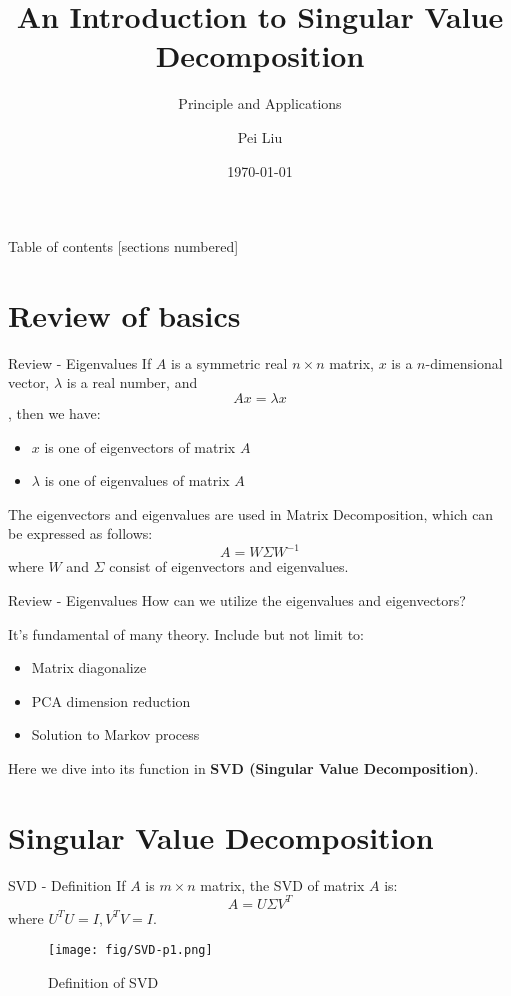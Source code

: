 \documentclass[10pt]{beamer}
\title{An Introduction to Singular Value Decomposition}
\subtitle{Principle and Applications}
\date{\today}
\author{Pei Liu}
\institute{Department of Computer Science @UESTC}
\begin{document}
\maketitle

\begin{frame}{Table of contents}
  [sections numbered]
  \tableofcontents[hideallsubsections]
\end{frame}

\section{Review of basics}

\begin{frame}{Review - Eigenvalues}
  If $A$ is a symmetric real $n\times n$ matrix, $x$ is a $n$-dimensional vector, $\lambda$ is a real number, and $$Ax=\lambda x$$, then we have:
  \begin{itemize}
    \item $x$ is one of eigenvectors of matrix $A$
    \item $\lambda$ is one of eigenvalues of matrix $A$
  \end{itemize}

  The eigenvectors and eigenvalues are used in \alert{Matrix Decomposition}, which can be expressed as follows: $$A=W\Sigma W^{-1}$$
  where $W$ and $\Sigma$ consist of eigenvectors and eigenvalues.
\end{frame}

\begin{frame}{Review - Eigenvalues}
  How can we utilize the eigenvalues and eigenvectors?

  It's fundamental of many theory. Include but not limit to:
  \begin{itemize}
    \item Matrix diagonalize
    \item PCA dimension reduction
    \item Solution to Markov process
  \end{itemize}

  Here we dive into its function in \textbf{SVD (Singular Value Decomposition)}.
\end{frame}

\section{Singular Value Decomposition}

\begin{frame}{SVD - Definition}
  If $A$ is $m \times n$ matrix, the SVD of matrix $A$ is:
  $$A=U\Sigma V^{T}$$
  where $U^{T}U=I, V^{T}V=I$.

  \begin{figure}[htbp]
    \centering
    \texttt{[image: fig/SVD-p1.png]}
    \caption{Definition of SVD}
  \end{figure}
\end{frame}
\end{document}
